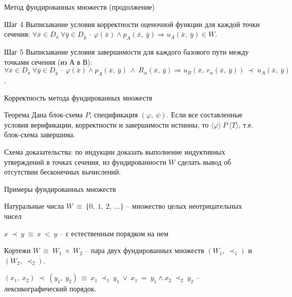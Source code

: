 \documentclass[hyperref={unicode=true}]{beamer}
\begin{document}
	\begin{frame}{Метод фундированных множеств (продолжение)}

	\begin{block}{Шаг 4}
	Выписывание условия корректности оценочной функции для каждой точки сечения:
	$\forall \bar{x} \in D_{\bar{x}} ~\forall \bar{y} \in D_{\bar{y}} ~\cdot~
	\varphi(\bar{x}) \land p_A(\bar{x},~\bar{y}) \Rightarrow u_A(\bar{x},~\bar{y}) \in W$.
	\end{block}
	\begin{block}{Шаг 5}
	Выписывание условия завершимости для каждого базового пути между точками сечения (из А в В):
	$\forall \bar{x} \in D_{\bar{x}} ~ \forall \bar{y} \in D_{\bar{y}} ~\cdot~
	\varphi(\bar{x}) \land p_A(\bar{x},~\bar{y})~\land~R_\alpha(\bar{x},~\bar{y}) \Rightarrow
	u_B(\bar{x},~r_\alpha(\bar{x},~\bar{y})) ~\prec~ u_A(\bar{x},~\bar{y})$.
	\end{block}
	\end{frame}

	\begin{frame}{Корректность метода фундированных множеств}

	\begin{block}{Теорема}
	Дана блок-схема $P$, спецификация $(\varphi,~\psi)$. Если все составленные условия верификации, корректности и завершимости истинны, то $\langle\varphi\rangle~P~\langle T \rangle$, т.е. блок-схема завершима.
	\end{block}

    Схема доказательства: по индукции доказать выполнение индуктивных утверждений в точках сечения, из фундированности $W$ сделать вывод об отсутствии бесконечных вычислений.
	\end{frame}

	\begin{frame}{Примеры фундированных множеств}
	\begin{block}{Натуральные числа}
	$W~\equiv~\{0,~1,~2,~\ldots\}$ -- множество целых неотрицательных чисел

	$x~\prec~y~\equiv~x~<~y$ -- с естественным порядком на нем
	\end{block}
	\begin{block}{Кортежи}
	$W~\equiv~W_1~\times~W_2$ -- пара двух фундированных множеств $(W_1,~\prec_1)$ и $(W_2,~\prec_2)$.

	$(x_1,~x_2)~\prec~(y_1,~y_2) ~\equiv~ x_1~\prec_1~y_1~\lor~x_1~=~y_1 \land x_2~\prec_2~y_2$ -- лексикографический порядок.
	\end{block}
	\end{frame}
\end{document}
